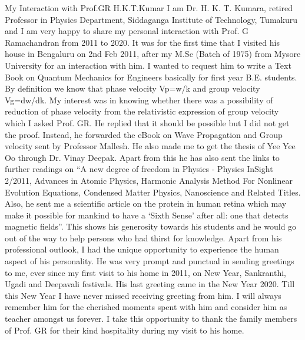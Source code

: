 My Interaction with Prof.GR
H.K.T.Kumar
I am Dr. H. K. T. Kumara, retired Professor in Physics Department, Siddaganga Institute of Technology, Tumakuru and I am very happy to share my personal interaction with Prof. G Ramachandran from 2011 to 2020. It was for the first time that I visited his house in Bengaluru on 2nd Feb 2011, after my M.Sc (Batch of 1975) from Mysore University for an interaction with him. I wanted to request him to write a Text Book on Quantum Mechanics for Engineers basically for first year B.E. students. By definition we know that phase velocity Vp=w/k and group velocity Vg=dw/dk.  My interest was in knowing whether there was a possibility of reduction of phase velocity from the relativistic expression of group velocity which I asked Prof. GR.  He replied that it should be possible but I did not get the proof. Instead, he forwarded the eBook on Wave Propagation and Group velocity sent by Professor Mallesh.  He also made me to get the thesis of Yee Yee Oo through Dr. Vinay Deepak. Apart from this he has also sent the links to further readings on “A new degree of freedom in Physics - Physics InSight 2/2011, Advances in Atomic Physics, Harmonic Analysis Method For Nonlinear Evolution Equations, Condensed Matter Physics, Nanoscience and Related Titles.  Also, he sent me a scientific article on the protein in human retina which may make it possible for mankind to have a ‘Sixth Sense’ after all: one that detects magnetic fields”. This shows his generosity towards his students and he would go out of the way to help persons who had thirst for knowledge. 
Apart from his professional outlook, I had the unique opportunity to experience the human aspect of his personality.  He was very prompt and punctual in sending greetings to me, ever since my first visit to his home in 2011, on New Year, Sankranthi, Ugadi and Deepavali festivals.  His last greeting came in the New Year 2020.  Till this New Year I have never missed receiving greeting from him. I will always remember him for the cherished  moments spent with him and consider him as teacher amongst us forever. I take this opportunity to thank the family members of Prof. GR for their kind hospitality during my visit to his home.


